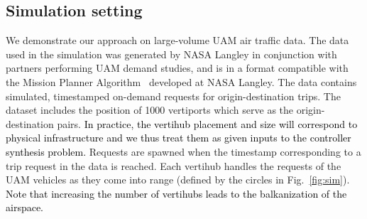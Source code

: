 

\subsection{Simulation setting}
We demonstrate our approach on large-volume UAM air traffic data. The data used in the simulation was generated by NASA Langley in conjunction with partners performing UAM demand studies, and is in a format compatible with the Mission Planner Algorithm~\cite{guerreiro2019mission} developed at NASA Langley. The data contains simulated, timestamped on-demand requests for origin-destination trips. The dataset includes the position of 1000 vertiports which serve as the origin-destination pairs. 
\textcolor{black}{In practice, the vertihub placement and size will correspond to physical infrastructure and we thus treat them as given inputs to the controller synthesis problem. 
}  
Requests are spawned when the timestamp corresponding to a trip request in the data is reached. Each vertihub handles the requests of the UAM vehicles as they come into range (defined by the circles in Fig.~\ref{fig:sim}). \textcolor{black}{Note that increasing the number of vertihubs leads to the balkanization of the airspace.}

